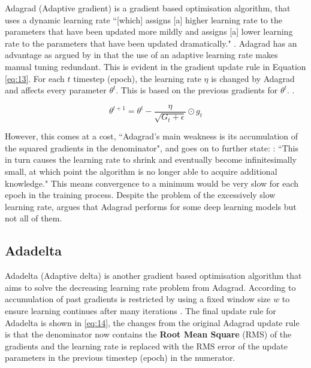 \documentclass[report, 11pt, oneside]{dissertation}
\begin{document}
Adagrad (Adaptive gradient) is a gradient based optimisation algorithm, that uses a dynamic learning rate ``[which] assigns [a] higher learning rate to the parameters that have been updated more mildly and assigns [a] lower learning rate to the parameters that have been updated dramatically." \citep[54]{wang:2017}. Adagrad has an advantage as argued by \citeauthor{Ruder:2016tr} in that the use of an adaptive learning rate makes manual tuning redundant. This is evident in the gradient update rule in Equation \ref{eq:13}. For each $t$ timestep (epoch), the learning rate $\eta$ is changed by Adagrad and affects every parameter $\theta^t$. This is based on the previous gradients for $\theta^t$. \citeyearpar[6]{Ruder:2016tr}.

\begin{equation} \label{eq:13}
	\theta^{t+1} = \theta^{t} - \frac{\eta}{\sqrt{G_{t} + \epsilon}} \odot g_{t}
\end{equation}

 However, this comes at a cost, ``Adagrad’s main weakness is its accumulation of the squared gradients in the denominator", and goes on to further state: \citep{Ruder:2016tr}: ``This in turn causes the learning rate to shrink and eventually become infinitesimally small, at which point the algorithm is no longer able to acquire additional knowledge." \citep[6]{Ruder:2016tr} This means convergence to a minimum would be very slow for each epoch in the training process. Despite the problem of the excessively slow learning rate, \citeauthor{Goodfellow-et-al-2016} argues that Adagrad performs for some deep learning models but not all of them. \citeyearpar[299]{Goodfellow-et-al-2016}
 
\subsection{Adadelta}

Adadelta (Adaptive delta) is another gradient based optimisation algorithm that aims to solve the decreasing learning rate problem from Adagrad. According to \citeauthor{Zeiler:2012uw} accumulation of past gradients is restricted by using a fixed window size $w$ to ensure learning continues after many iterations \citeyearpar[3]{Zeiler:2012uw}. The final update rule for Adadelta is shown in \ref{eq:14}, the changes from the original Adagrad update rule is that the denominator now contains the \textbf{Root Mean Square} (RMS) of the gradients and the learning rate is replaced with the RMS error of the update parameters in the previous timestep (epoch) in the numerator.
\end{document}

